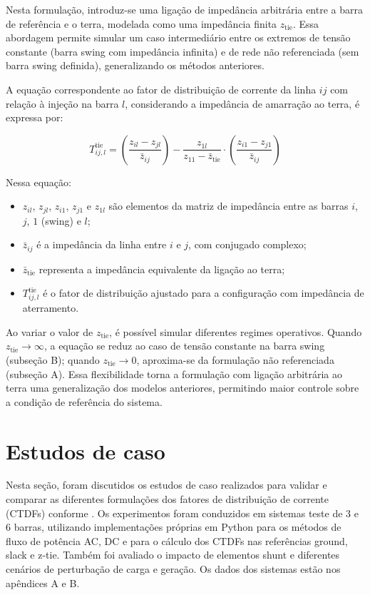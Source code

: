 \documentclass[journal]{IEEEtran}
\begin{document}
Nesta formulação, introduz-se uma ligação de impedância arbitrária entre a barra de referência e o terra, modelada como uma impedância finita \( z_{\text{tie}} \). Essa abordagem permite simular um caso intermediário entre os extremos de tensão constante (barra swing com impedância infinita) e de rede não referenciada (sem barra swing definida), generalizando os métodos anteriores.

A equação correspondente ao fator de distribuição de corrente da linha \( ij \) com relação à injeção na barra \( l \), considerando a impedância de amarração ao terra, é expressa por:

\begin{equation}
T^{\text{tie}}_{ij,l} = \left( \frac{z_{il} - z_{jl}}{\bar{z}_{ij}} \right) - \frac{z_{1l}}{z_{11} - \bar{z}_{\text{tie}}} \cdot \left( \frac{z_{i1} - z_{j1}}{\bar{z}_{ij}} \right)
\label{eq:lig_terra}
\end{equation}

Nessa equação:
\begin{itemize}
  \item \( z_{il} \), \( z_{jl} \), \( z_{i1} \), \( z_{j1} \) e \( z_{1l} \) são elementos da matriz de impedância entre as barras \( i \), \( j \), \( 1 \) (swing) e \( l \);
  \item \( \bar{z}_{ij} \) é a impedância da linha entre \( i \) e \( j \), com conjugado complexo;
  \item \( \bar{z}_{\text{tie}} \) representa a impedância equivalente da ligação ao terra;
  \item \( T^{\text{tie}}_{ij,l} \) é o fator de distribuição ajustado para a configuração com impedância de aterramento.
\end{itemize}

Ao variar o valor de \( z_{\text{tie}} \), é possível simular diferentes regimes operativos. Quando \( z_{\text{tie}} \rightarrow \infty \), a equação se reduz ao caso de tensão constante na barra swing (subseção B); quando \( z_{\text{tie}} \rightarrow 0 \), aproxima-se da formulação não referenciada (subseção A). Essa flexibilidade torna a formulação com ligação arbitrária ao terra uma generalização dos modelos anteriores, permitindo maior controle sobre a condição de referência do sistema.


\section{Estudos de caso}
Nesta seção, foram discutidos os estudos de caso realizados para validar e comparar as diferentes formulações dos fatores de distribuição de corrente (CTDFs) conforme \cite{ref1}. Os experimentos foram conduzidos em sistemas teste de 3 e 6 barras, utilizando implementações próprias em Python para os métodos de fluxo de potência AC, DC e para o cálculo dos CTDFs nas referências ground, slack e z-tie. Também foi avaliado o impacto de elementos shunt e diferentes cenários de perturbação de carga e geração. Os dados dos sistemas estão nos apêndices A e B.
\end{document}
